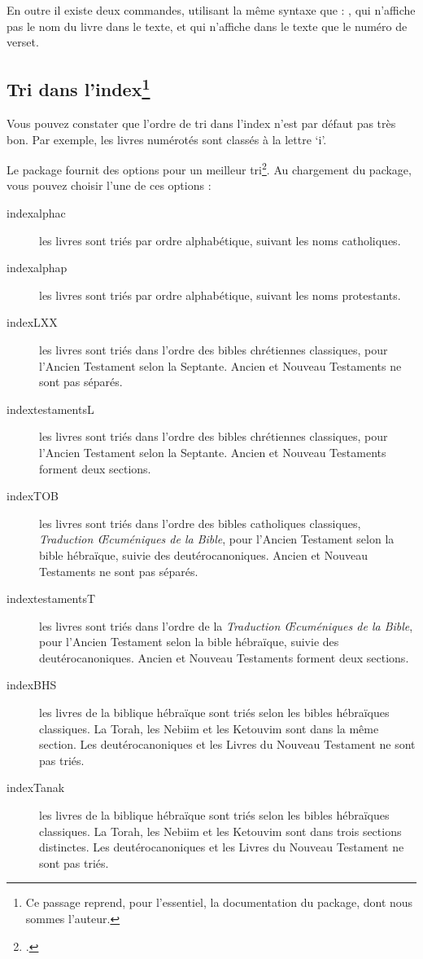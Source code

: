 En outre il existe deux commandes, utilisant la même syntaxe que  : , qui n'affiche pas le nom du livre dans le texte, et  qui n'affiche dans le texte que le numéro de verset.

\subsection[Tri dans l'index]{Tri dans l'index\footnote{Ce passage reprend, pour l'essentiel, la documentation du package, dont nous sommes l'auteur.}}

Vous pouvez constater que l'ordre de tri dans l'index n'est par défaut pas très bon. Par exemple, les livres numérotés sont classés à la lettre `i'. 

Le package fournit des options pour un meilleur tri\footcite[Pour l'Ancien Testament les protestants suivent le canon juif pour son contenu mais utilisent l'ordre du canon catholique, voir][]{canons}. Au chargement du package, vous pouvez choisir l'une de ces options :
 \begin{description}
 \item[indexalphac] les livres sont triés par ordre alphabétique, suivant les noms catholiques.
\item[indexalphap] les livres sont triés par ordre alphabétique, suivant les noms protestants.
\item[indexLXX]les livres sont triés dans l'ordre des bibles chrétiennes classiques, pour l'Ancien Testament  selon la Septante. Ancien et Nouveau Testaments ne sont pas séparés.
\item[indextestamentsL] les livres sont triés dans l'ordre des bibles chrétiennes classiques, pour l'Ancien Testament  selon la Septante. Ancien et Nouveau Testaments forment deux sections.
\item[indexTOB] les livres sont triés dans l'ordre des bibles catholiques classiques, \emph{Traduction Œcuméniques de la Bible}, pour l'Ancien Testament  selon la bible hébraïque, suivie des deutérocanoniques. Ancien et Nouveau Testaments ne sont pas séparés.
\item[indextestamentsT] les livres sont triés dans l'ordre de la \emph{Traduction Œcuméniques de la Bible}, pour l'Ancien Testament  selon la bible hébraïque, suivie des deutérocanoniques. Ancien et Nouveau Testaments forment deux sections.
\item[indexBHS] les livres de la biblique hébraïque sont triés selon les bibles hébraïques classiques. La Torah, les Nebiim et les Ketouvim sont dans la même section. Les deutérocanoniques et les Livres du Nouveau Testament ne sont pas triés.
\item[indexTanak] les livres de la biblique hébraïque sont triés selon les bibles hébraïques classiques. La Torah, les Nebiim et les Ketouvim sont dans trois sections distinctes. Les deutérocanoniques et les Livres du Nouveau Testament ne sont pas triés.
\end{description}


